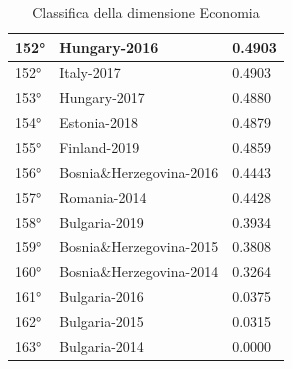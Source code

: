 \documentclass[a4paper,12pt, openright]{report}
\begin{document}
\begin{table}[h!]
\begin{tabular}{ |l|l|l|  }
        \hline
        152° & Hungary-2016  & 0.4903 \\
        \hline
        152° & Italy-2017 & 0.4903 \\
        \hline
        153° & Hungary-2017 & 0.4880 \\
        \hline
        154° & Estonia-2018 & 0.4879 \\
        \hline
        155° & Finland-2019  & 0.4859 \\
        \hline
        156° & Bosnia\&Herzegovina-2016 & 0.4443 \\
        \hline
        157° & Romania-2014  & 0.4428 \\
        \hline
        158° & Bulgaria-2019 & 0.3934 \\
        \hline
        159° & Bosnia\&Herzegovina-2015 & 0.3808 \\
        \hline
        160° & Bosnia\&Herzegovina-2014 & 0.3264 \\
        \hline
        161° & Bulgaria-2016 & 0.0375 \\
        \hline
        162° & Bulgaria-2015 & 0.0315 \\
        \hline
        163° & Bulgaria-2014  & 0.0000 \\
        \hline
    \end{tabular}
    \caption{Classifica della dimensione Economia}
    \label{table:1}
\end{table}
    
\end{document}
